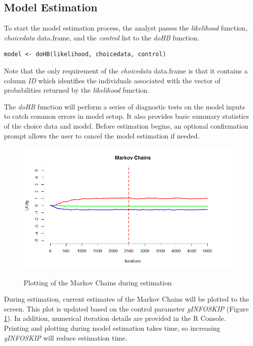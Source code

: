 \documentclass{article}\usepackage[]{graphicx}\usepackage[]{color}
\begin{document}
\subsection*{Model Estimation}

To start the model estimation process, the analyst passes the \emph{likelihood} function, \emph{choicedata} data.frame, and the \emph{control} list to the \emph{doHB} function.

\begin{verbatim}
model <- doHB(likelihood, choicedata, control)
\end{verbatim}



Note that the only requirement of the \emph{choicedata} data.frame is that it contains a column \emph{ID} which identifies the individuals associated with the vector of probabilities returned by the \emph{likelihood} function.

The \emph{doHB} function will perform a series of diagnostic tests on the model inputs to catch common errors in model setup. It also provides basic summary statistics of the choice data and model. Before estimation begins, an optional confirmation prompt allows the user to cancel the model estimation if needed.

\begin{figure}
\caption{Plotting of the Markov Chains during estimation}
\centering
\includegraphics[scale=0.50]{MNL_MarkovChains.png}
\label{MarkovChain}
\end{figure}

During estimation, current estimates of the Markov Chains will be plotted to the screen. This plot is updated based on the control parameter \emph{gINFOSKIP} (Figure \ref{MarkovChain}). In addition, numerical iteration details are provided in the R Console. Printing and plotting during model estimation takes time, so increasing \emph{gINFOSKIP} will reduce estimation time.
\end{document}
